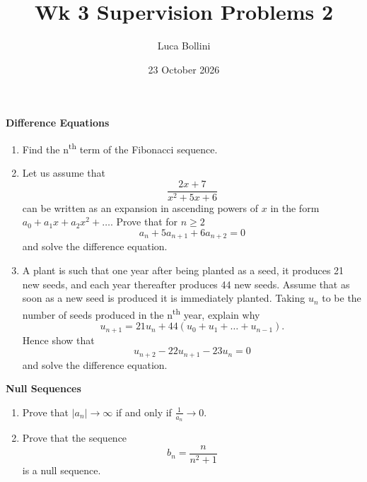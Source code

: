 \documentclass{article}
\title{Wk 3 Supervision Problems 2}
\author{Luca Bollini}
\date{23 October 2026}
\begin{document}
\maketitle

\begin{center}
\huge{\textbf{Difference Equations}}
\end{center}

\begin{enumerate}

    
    \item Find the n\textsuperscript{th} term of the Fibonacci sequence.
    \item Let us assume that
    \[
    \frac{2x+7}{x^2+5x+6}
    \]
    can be written as an expansion in ascending powers of $x$ in the form $a_0 + a_1x +a_2x^2 + \dots$.
    Prove that for $n\geq 2$
    \[
    a_n + 5a_{n+1} + 6a_{n+2} = 0
    \]
    and solve the difference equation.
    \item A plant is such that one year after being planted as a seed, it produces 21 new seeds, and each year thereafter produces 44 new seeds. Assume that as soon as a new seed is produced it is immediately planted. Taking $u_n$ to be the number of seeds produced in the n\textsuperscript{th} year, explain why
    \[
    u_{n+1} = 21u_{n} + 44(u_0 + u_1 + \dots +u_{n-1}).
    \]
    Hence show that
    \[
    u_{n+2} - 22u_{n+1} - 23u_n = 0
    \]
    and solve the difference equation.
\end{enumerate}


\begin{center}
\huge{\textbf{Null Sequences}}
\end{center}

\begin{enumerate}
    \item Prove that $|a_n| \to\infty$ if and only if $\frac{1}{a_n}\to0$.
    \item Prove that the sequence
    \[
    b_n =\frac{n}{n^2+1}
    \]
    is a null sequence.

    
\end{enumerate}
\end{document}
